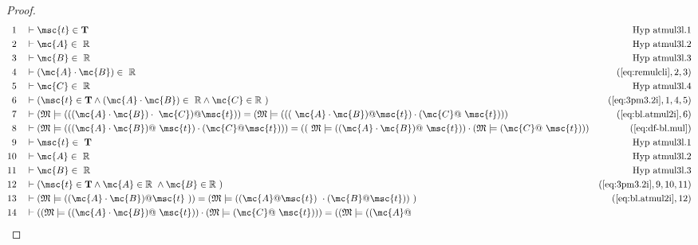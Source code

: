 \begin{proof}
\begin{align}
  1 &&  & \vdash \msc{t} \in \mathbf{T}&\text{Hyp~atmul3l.1}\notag%
  \\ 2 &&  & \vdash \mc{A} \in
     ~\mathbb{R}&\text{Hyp~atmul3l.2}\notag%
  \\ 3 &&  & \vdash \mc{B} \in
     ~\mathbb{R}&\text{Hyp~atmul3l.3}\notag%
  \\ 4 &&  & \vdash ( \mc{A} \cdot \mc{B} ) \in
     ~\mathbb{R}&(\mbox{\ref{eq:remulcli}},2,3)\notag
  \\ 5 &&  & \vdash \mc{C} \in
     ~\mathbb{R}&\text{Hyp~atmul3l.4}\notag%
  \\ 6 &&  & \vdash ( \msc{t} \in \mathbf{T} \wedge ( \mc{A} \cdot \mc{B} ) \in
     ~\mathbb{R} \wedge \mc{C} \in \mathbb{R}
     ~)&(\mbox{\ref{eq:3pm3.2i}},1,4,5)\notag
  \\ 7 &&  & \vdash ( \mathfrak{M} \models ( ( ( \mc{A} \cdot \mc{B} ) \cdot
     ~\mc{C} ) @ \msc{t} ) ) = ( \mathfrak{M} \models ( ( (
     ~\mc{A} \cdot \mc{B} ) @ \msc{t} ) \cdot ( \mc{C} @
     ~\msc{t} ) ) )&(\mbox{\ref{eq:bl.atmul2i}},6)\notag
  \\ 8 &&  & \vdash ( \mathfrak{M} \models ( ( ( \mc{A} \cdot \mc{B} ) @
     ~\msc{t} ) \cdot ( \mc{C} @ \msc{t} ) ) ) = ( (
     ~\mathfrak{M} \models ( ( \mc{A} \cdot \mc{B} ) @
     ~\msc{t} ) ) \cdot ( \mathfrak{M} \models ( \mc{C} @
     ~\msc{t} ) ) )&(\mbox{\ref{eq:df-bl.mul}})\notag
  \\ 9 &&  & \vdash \msc{t} \in
     ~\mathbf{T}&\text{Hyp~atmul3l.1}\notag%
  \\ 10 &&  & \vdash \mc{A} \in
     ~\mathbb{R}&\text{Hyp~atmul3l.2}\notag%
  \\ 11 &&  & \vdash \mc{B} \in
     ~\mathbb{R}&\text{Hyp~atmul3l.3}\notag%
  \\ 12 &&  & \vdash ( \msc{t} \in \mathbf{T} \wedge \mc{A} \in \mathbb{R}
     ~\wedge \mc{B} \in \mathbb{R}
     ~)&(\mbox{\ref{eq:3pm3.2i}},9,10,11)\notag
  \\ 13 &&  & \vdash ( \mathfrak{M} \models ( ( \mc{A} \cdot \mc{B} ) @ \msc{t}
     ~) ) = ( \mathfrak{M} \models ( ( \mc{A} @ \msc{t} )
     ~\cdot ( \mc{B} @ \msc{t} ) )
     ~)&(\mbox{\ref{eq:bl.atmul2i}},12)\notag
  \\ 14 &&  & \vdash ( ( \mathfrak{M} \models ( ( \mc{A} \cdot \mc{B} ) @
     ~\msc{t} ) ) \cdot ( \mathfrak{M} \models ( \mc{C} @
     ~\msc{t} ) ) ) = ( ( \mathfrak{M} \models ( ( \mc{A} @

\end{align}
\end{proof}
